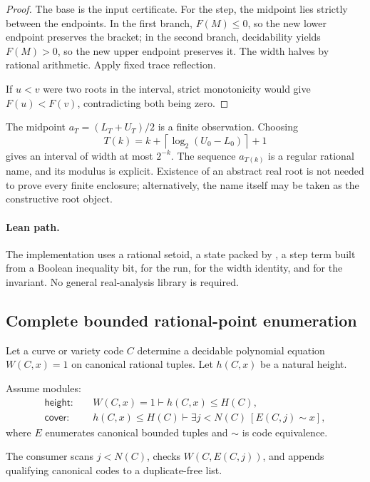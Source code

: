 \begin{proof}
The base is the input certificate.  For the step, the midpoint lies strictly
between the endpoints.  In the first branch, \(F(M)\le0\), so the new lower
endpoint preserves the bracket; in the second branch, decidability yields
\(F(M)>0\), so the new upper endpoint preserves it.  The width halves by
rational arithmetic.  Apply fixed trace reflection.

If \(u<v\) were two roots in the interval, strict monotonicity would give
\(F(u)<F(v)\), contradicting both being zero.
\end{proof}

The midpoint \(a_T=(L_T+U_T)/2\) is a finite observation.  Choosing
\[
 T(k)=k+\left\lceil\log_2(U_0-L_0)\right\rceil+1
\]
gives an interval of width at most \(2^{-k}\).  The sequence \(a_{T(k)}\) is a
regular rational name, and its modulus is explicit.  Existence of an abstract
real root is not needed to prove every finite enclosure; alternatively, the
name itself may be taken as the constructive root object.

\paragraph{Lean path.}
The implementation uses a rational setoid, a state packed by , a
step term built from a Boolean inequality bit,  for the run,
 for the width identity, and  for the invariant.
No general real-analysis library is required.

\subsection{Complete bounded rational-point enumeration}

Let a curve or variety code \(C\) determine a decidable polynomial equation
\(W(C,x)=1\) on canonical rational tuples.  Let \(h(C,x)\) be a natural height.

Assume modules:
\[
\begin{aligned}
 \mathsf{height}:&
 \quad W(C,x)=1\vdash h(C,x)\le H(C),\\
 \mathsf{cover}:&
 \quad h(C,x)\le H(C)\vdash
   \exists j<N(C)\ [E(C,j)\sim x],
\end{aligned}
\]
where \(E\) enumerates canonical bounded tuples and \(\sim\) is code
equivalence.

The consumer scans \(j<N(C)\), checks \(W(C,E(C,j))\), and appends qualifying
canonical codes to a duplicate-free list.

